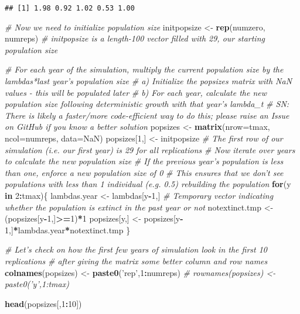 \documentclass[]{article}
\newenvironment{Shaded}{\begin{snugshade}}{\end{snugshade}}
\newcommand{\KeywordTok}[1]{\textcolor[rgb]{0.13,0.29,0.53}{\textbf{#1}}}
\newcommand{\DataTypeTok}[1]{\textcolor[rgb]{0.13,0.29,0.53}{#1}}
\newcommand{\DecValTok}[1]{\textcolor[rgb]{0.00,0.00,0.81}{#1}}
\newcommand{\StringTok}[1]{\textcolor[rgb]{0.31,0.60,0.02}{#1}}
\newcommand{\CommentTok}[1]{\textcolor[rgb]{0.56,0.35,0.01}{\textit{#1}}}
\newcommand{\OtherTok}[1]{\textcolor[rgb]{0.56,0.35,0.01}{#1}}
\newcommand{\ControlFlowTok}[1]{\textcolor[rgb]{0.13,0.29,0.53}{\textbf{#1}}}
\newcommand{\OperatorTok}[1]{\textcolor[rgb]{0.81,0.36,0.00}{\textbf{#1}}}
\newcommand{\NormalTok}[1]{#1}
\begin{document}
\begin{verbatim}
## [1] 1.98 0.92 1.02 0.53 1.00
\end{verbatim}

\begin{Shaded}
\begin{Highlighting}[]
\CommentTok{# Now we need to initialize population size}
\NormalTok{initpopsize <-}\StringTok{ }\KeywordTok{rep}\NormalTok{(numzero, numreps) }\CommentTok{# initpopsize is a length-100 vector filled with 29, our starting population size}

\CommentTok{# For each year of the simulation, multiply the current population size by the lambdas*last year's population size}
\CommentTok{#   a) Initialize the popsizes matrix with NaN values - this will be populated later}
\CommentTok{#   b) For each year, calculate the new population size following deterministic growth with that year's lambda_t}
\CommentTok{# SN: There is likely a faster/more code-efficient way to do this; please raise an Issue on GitHub if you know a better solution}
\NormalTok{popsizes <-}\StringTok{ }\KeywordTok{matrix}\NormalTok{(}\DataTypeTok{nrow=}\NormalTok{tmax, }\DataTypeTok{ncol=}\NormalTok{numreps, }\DataTypeTok{data=}\OtherTok{NaN}\NormalTok{)}
\NormalTok{popsizes[}\DecValTok{1}\NormalTok{,] <-}\StringTok{ }\NormalTok{initpopsize }\CommentTok{# The first row of our simulation (i.e. our first year) is 29 for all replications}
\CommentTok{# Now iterate over years to calculate the new population size}
\CommentTok{# If the previous year's population is less than one, enforce a new population size of 0 }
\CommentTok{#    This ensures that we don't see populations with less than 1 individual (e.g. 0.5) rebuilding the population}
\ControlFlowTok{for}\NormalTok{(y }\ControlFlowTok{in} \DecValTok{2}\OperatorTok{:}\NormalTok{tmax)\{}
\NormalTok{  lambdas.year <-}\StringTok{ }\NormalTok{lambdas[y}\OperatorTok{-}\DecValTok{1}\NormalTok{,]}
  \CommentTok{# Temporary vector indicating whether the population is extinct in the past year or not}
\NormalTok{  notextinct.tmp <-}\StringTok{ }\NormalTok{(popsizes[y}\OperatorTok{-}\DecValTok{1}\NormalTok{,]}\OperatorTok{>=}\DecValTok{1}\NormalTok{)}\OperatorTok{*}\DecValTok{1}
\NormalTok{  popsizes[y,] <-}\StringTok{ }\NormalTok{popsizes[y}\OperatorTok{-}\DecValTok{1}\NormalTok{,]}\OperatorTok{*}\NormalTok{lambdas.year}\OperatorTok{*}\NormalTok{notextinct.tmp}
\NormalTok{\}}

\CommentTok{# Let's check on how the first few years of simulation look in the first 10 replications}
\CommentTok{# after giving the matrix some better column and row names}
\KeywordTok{colnames}\NormalTok{(popsizes) <-}\StringTok{ }\KeywordTok{paste0}\NormalTok{(}\StringTok{'rep'}\NormalTok{,}\DecValTok{1}\OperatorTok{:}\NormalTok{numreps)}
\CommentTok{# rownames(popsizes) <- paste0('y',1:tmax)}

\KeywordTok{head}\NormalTok{(popsizes[,}\DecValTok{1}\OperatorTok{:}\DecValTok{10}\NormalTok{])}
\end{Highlighting}
\end{Shaded}
\end{document}
